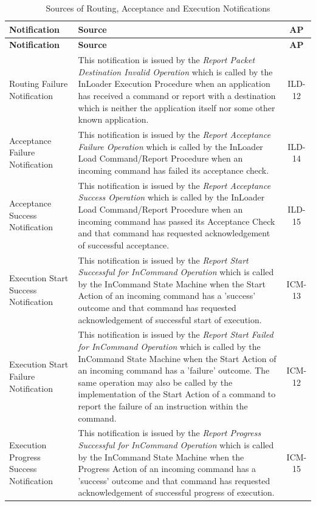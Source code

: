 \documentclass[a4paper,10pt]{article}
\begin{document}
\begin{longtable}{|>{\raggedright\arraybackslash}p{2.1cm}|>{\raggedright\arraybackslash}p{9.8cm}|c|}
\caption{Sources of Routing, Acceptance and Execution Notifications}\label{tab:sourcesNotif} \\
\hline
\rowcolor{light-gray}
\textbf{Notification} & \textbf{Source} & \textbf{AP} \\
\hline\hline
\endfirsthead
\rowcolor{light-gray}
\textbf{Notification} & \textbf{Source} & \textbf{AP} \\
\hline\hline
\endhead
Routing Failure Notification & This notification is issued by the \textit{Report Packet Destination Invalid Operation} which is called by the InLoader Execution Procedure when an application has received a command or report with a destination which is neither the application itself nor some other known application. & ILD-12 \\
\hline
Acceptance Failure Notification & This notification is issued by the \textit{Report Acceptance Failure Operation} which is called by the InLoader Load Command/Report Procedure when an incoming command has failed its acceptance check. & ILD-14 \\
\hline
Acceptance Success Notification & This notification is issued by the \textit{Report Acceptance Success Operation} which is called by the InLoader Load Command/Report Procedure when an incoming command has passed its Acceptance Check and that command has requested acknowledgement of successful acceptance. & ILD-15 \\
\hline
Execution Start Success Notification &  This notification is issued by the \textit{Report Start Successful for InCommand Operation} which is called by the InCommand State Machine when the Start Action of an incoming command has a 'success' outcome and that command has requested acknowledgement of successful start of execution. & ICM-13 \\
\hline 
Execution Start Failure Notification &  This notification is issued by the \textit{Report Start Failed for InCommand Operation} which is called by the InCommand State Machine when the Start Action of an incoming command has a 'failure' outcome. The same operation may also be called by the implementation of the Start Action of a command to report the failure of an instruction within the command. & ICM-12 \\
\hline
Execution Progress Success Notification &  This notification is issued by the \textit{Report Progress Successful for InCommand Operation} which is called by the InCommand State Machine when the Progress Action of an incoming command has a 'success' outcome and that command has requested acknowledgement of successful progress of execution. & ICM-15 \\

\end{longtable}
\end{document}
